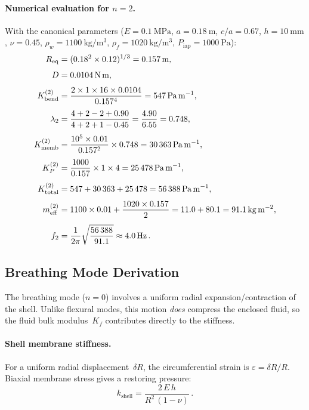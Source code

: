 \documentclass[12pt]{article}
\begin{document}
\paragraph{Numerical evaluation for $n=2$.}
With the canonical parameters ($E=\SI{0.1}{\mega\pascal}$, $a=\SI{0.18}{\metre}$,
$c/a=0.67$, $h=\SI{10}{\milli\metre}$, $\nu=0.45$, $\rho_{w}=\SI{1100}{\kilo\gram\per\metre\cubed}$,
$\rho_{f}=\SI{1020}{\kilo\gram\per\metre\cubed}$, $P_{\mathrm{iap}}=\SI{1000}{\pascal}$):
\begin{align*}
  R_{\mathrm{eq}} &= (0.18^{2}\times 0.12)^{1/3} = \SI{0.157}{\metre}, \\[4pt]
  D &= \SI{0.0104}{\newton\metre}, \\[4pt]
  K_{\mathrm{bend}}^{(2)} &= \frac{2 \times 1 \times 16 \times 0.0104}{0.157^{4}}
    = \SI{547}{\pascal\per\metre}, \\[4pt]
  \lambda_{2} &= \frac{4+2-2+0.90}{4+2+1-0.45} = \frac{4.90}{6.55} = 0.748, \\[4pt]
  K_{\mathrm{memb}}^{(2)} &= \frac{10^{5}\times 0.01}{0.157^{2}}\times 0.748
    = \SI{30\,363}{\pascal\per\metre}, \\[4pt]
  K_{P}^{(2)} &= \frac{1000}{0.157}\times 1 \times 4 = \SI{25\,478}{\pascal\per\metre}, \\[4pt]
  K_{\mathrm{total}}^{(2)} &= 547 + 30\,363 + 25\,478 = \SI{56\,388}{\pascal\per\metre}, \\[4pt]
  m_{\mathrm{eff}}^{(2)} &= 1100\times 0.01 + \frac{1020\times 0.157}{2}
    = 11.0 + 80.1 = \SI{91.1}{\kilo\gram\per\metre\squared}, \\[4pt]
  f_{2} &= \frac{1}{2\pi}\sqrt{\frac{56\,388}{91.1}} \approx \SI{4.0}{\hertz} \,.
\end{align*}

\subsection{Breathing Mode Derivation}
\label{sec:breathing}

The breathing mode ($n=0$) involves a uniform radial expansion/contraction
of the shell.  Unlike flexural modes, this motion \emph{does} compress the
enclosed fluid, so the fluid bulk modulus~$K_{f}$ contributes directly to the
stiffness.

\paragraph{Shell membrane stiffness.}
For a uniform radial displacement~$\delta R$, the circumferential strain is
$\varepsilon = \delta R / R$.  Biaxial membrane stress gives a restoring
pressure:
\begin{equation}
  k_{\mathrm{shell}} = \frac{2\,E\,h}{R^{2}\,(1-\nu)} \,.
  \tag{S9}
  \label{eq:k_shell_breathing}
\end{equation}
\end{document}
